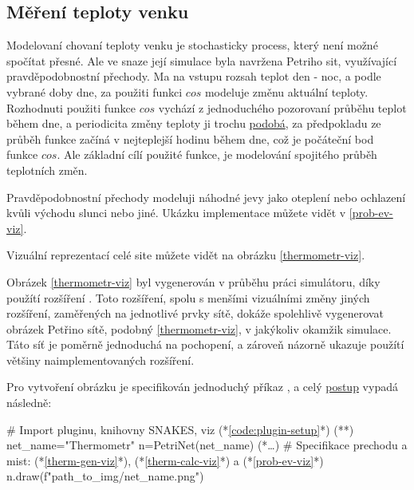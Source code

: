 \subsection{Měření teploty venku}
\label{subsec:mereni-teploty}
Modelovaní chovaní teploty venku je stochasticky process, který není možné spočítat přesné. Ale ve snaze její simulace byla navržena Petriho sit, využívající pravděpodobnostní přechody. Ma na vstupu rozsah teplot den - noc, a podle vybrané doby dne, za použiti funkci $cos$ modeluje změnu aktuální teploty. Rozhodnuti použiti funkce $cos$ vychází z jednoduchého pozorovaní průběhu teplot během dne, a periodicita změny teploty ji trochu \href{https://forecast.weather.gov/MapClick.php?lat=42.3758&lon=-71.1187&lg=english&FcstType=graphical}{podobá}, za předpokladu ze průběh funkce začíná v nejteplejší hodinu během dne, což je počáteční bod funkce $cos$. Ale základní cílí použité funkce, je modelování spojitého průběh teplotních změn.

Pravděpodobnostní přechody modeluji náhodné jevy jako oteplení nebo ochlazení kvůli východu slunci nebo jiné. Ukázku implementace můžete vidět v \ref{prob-ev-viz}.

Vizuální reprezentací celé site můžete vidět na obrázku \ref{thermometr-viz}.

Obrázek \ref{thermometr-viz} byl vygenerován v průběhu práci simulátoru, díky použítí rozšíření \href{https://www.ibisc.univ-evry.fr/~fpommereau/SNAKES/API/plugins/gv.html}{}. Toto rozšíření, spolu s menšími vizuálními změny jiných rozšíření, zaměřených na jednotlivé prvky sítě, dokáže spolehlivě vygenerovat obrázek Petřino sítě, podobný \ref{thermometr-viz}, v jakýkoliv okamžik simulace. Táto síť je poměrně jednoduchá na pochopení, a zároveň názorně ukazuje použítí většiny naimplementovaných rozšíření.

Pro vytvoření obrázku je specifikován jednoduchý příkaz , a celý \hyperref[code:thermometr-draw]{postup} vypadá následně:

\begin{python}
  # Import pluginu, knihovny SNAKES, viz (*\ref{code:plugin-setup}*) (*\label{code:thermometr-draw}*)
  net_name="Thermometr"
  n=PetriNet(net_name)
  (*\ldots*) # Specifikace prechodu a mist: (*\ref{therm-gen-viz}*), (*\ref{therm-calc-viz}*) a (*\ref{prob-ev-viz}*)
  n.draw(f"{path_to_img}/{net_name}.png")
\end{python}

